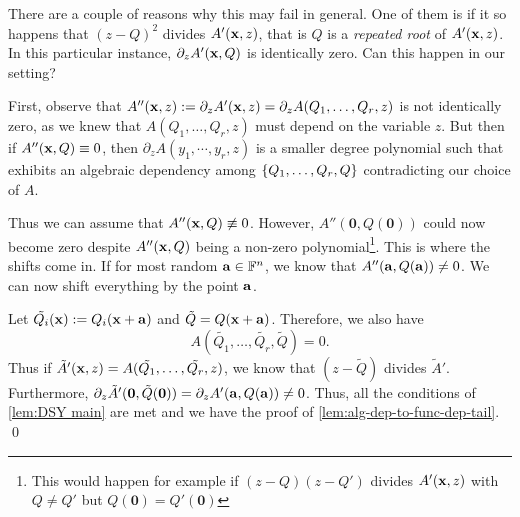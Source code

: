 There are a couple of reasons why this may fail in general.
One of them is if it so happens that $(z-Q)^2$ divides $A'(\mathbf{x}, z)$, that is $Q$ is a \emph{repeated root} of $A'(\mathbf{x}, z)$. In this particular instance, $\partial_z A'(\mathbf{x}, Q)$ is identically zero. Can this happen in our setting? 

First, observe that $A''(\mathbf{x}, z) := \partial_z A'(\mathbf{x}, z) = \partial_z A(Q_1,\ldots, Q_r,z)$ is not identically zero, as we knew that $A(Q_1,\ldots, Q_r,z)$ must depend on the variable $z$. But then if $A''(\mathbf{x}, Q) \equiv 0$, then $\partial_z A(y_1,\cdots, y_r, z)$ is a smaller degree polynomial such that exhibits an algebraic dependency among $\left\{Q_1,\ldots, Q_r, Q\right\}$ contradicting our choice of $A$. 

Thus we can assume that $A''(\mathbf{x}, Q) \not\equiv 0$. However, $A''(\mathbf{0}, Q(\mathbf{0}))$ could now become zero despite $A''(\mathbf{x}, Q)$ being a non-zero polynomial\footnote{This would happen for example if $(z - Q)(z - Q')$ divides $A'(\mathbf{x}, z)$ with $Q \neq Q'$ but $Q(\mathbf{0}) = Q'(\mathbf{0})$}. This is where the shifts come in. If for most random $\mathbf{a} \in \mathbb{F}^n$, we know that $A''(\mathbf{a}, Q(\mathbf{a})) \neq 0$. We can now shift everything by the point $\mathbf{a}$. 

Let $\tilde{Q_i}(\mathbf{x}) := Q_i(\mathbf{x} + \mathbf{a})$ and $\tilde{Q} = Q(\mathbf{x} + \mathbf{a})$. Therefore, we also have
\[
A(\tilde{Q_1}, \ldots, \tilde{Q_r}, \tilde{Q}) = 0.
\]
Thus if $\tilde{A}'(\mathbf{x}, z) = A(\tilde{Q_1},\ldots, \tilde{Q_r}, z)$, we know that $(z - \tilde{Q})$ divides $\tilde{A}'$. Furthermore, $\partial_z\tilde{A}'(\mathbf{0}, \tilde{Q}(\mathbf{0})) = \partial_zA'(\mathbf{\mathbf{a}}, Q(\mathbf{\mathbf{a}})) \neq 0$. Thus, all the conditions of \autoref{lem:DSY main} are met and we have the proof of \autoref{lem:alg-dep-to-func-dep-tail}. \qed{}\\

